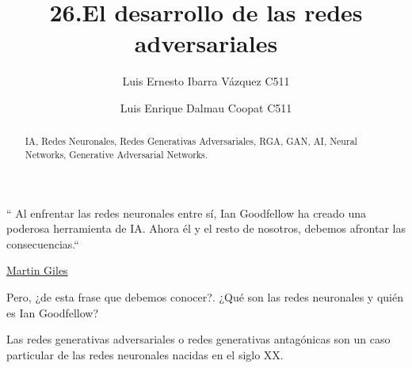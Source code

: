 \documentclass[a4paper]{article}
\begin{document}
\title{26.El desarrollo de las redes adversariales}
\author{Luis Ernesto Ibarra Vázquez C511\and
Luis Enrique Dalmau Coopat C511}
%
%

\maketitle

\begin{abstract}
	IA, Redes Neuronales, Redes Generativas Adversariales, RGA, 
	GAN, AI, Neural Networks, Generative Adversarial Networks.
\end{abstract}

`` Al enfrentar las redes neuronales entre sí, Ian Goodfellow ha 
creado una poderosa herramienta de IA. Ahora él y el resto de
nosotros, debemos afrontar las consecuencias.``

\begin{flushright}

\href{https://www.technologyreview.com/author/martin-giles/}
{Martin Giles}

\end{flushright}

Pero, ¿de esta frase que debemos conocer?. ¿Qué son las redes 
neuronales y quién es Ian Goodfellow?

Las redes generativas adversariales o redes generativas 
antagónicas son un caso particular de las redes neuronales nacidas 
en el siglo XX.
\end{document}
